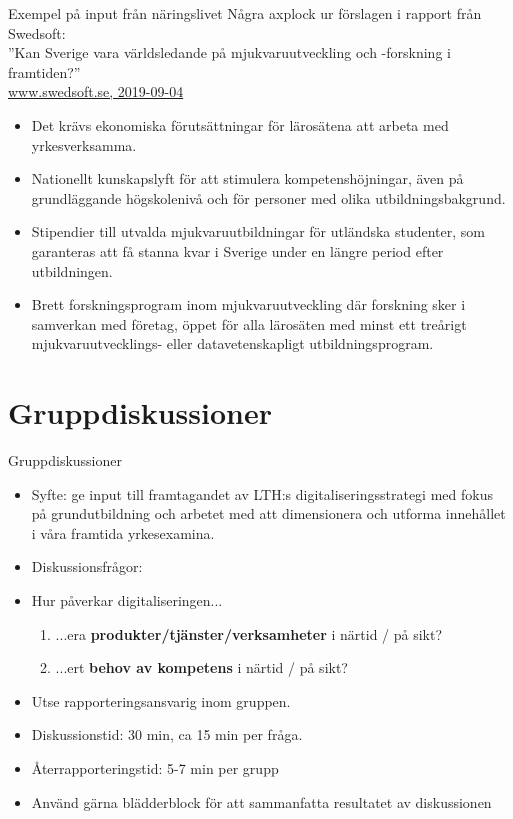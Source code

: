 \documentclass[aspectratio=169]{beamer}
\newenvironment{Slide}[1]%
  {\begin{frame}[environment=Slide]{#1}}
  {\end{frame}}%
\begin{document}
\begin{Slide}{Exempel på input från näringslivet}
  Några axplock ur förslagen i rapport från Swedsoft: \\''Kan Sverige vara världsledande på mjukvaruutveckling och -forskning i framtiden?''\\
  \href{https://www.swedsoft.se/wp-content/uploads/sites/7/2019/09/Swedsoft-Helhetssyn-p\%C3\%A5-mjukvarans-betydelse-f\%C3\%B6r-digitalisering-och-konkurrenskraft.pdf}{www.swedsoft.se, 2019-09-04}
\begin{itemize}
  \item Det krävs ekonomiska förutsättningar för lärosätena att arbeta med yrkesverksamma.
  \item Nationellt kunskapslyft för att stimulera kompetenshöjningar, även på grundläggande högskolenivå och för personer med olika utbildningsbakgrund.
  \item Stipendier till utvalda mjukvaruutbildningar för utländska studenter, som garanteras att få stanna kvar i Sverige under en längre period efter utbildningen.
  \item Brett forskningsprogram inom mjukvaruutveckling där forskning sker i samverkan med företag, öppet för alla lärosäten med minst ett treårigt mjukvaruutvecklings- eller datavetenskapligt utbildningsprogram.
\end{itemize}
\end{Slide}




\section{Gruppdiskussioner}

\begin{Slide}{Gruppdiskussioner}
  \begin{itemize}
    \item Syfte: ge input till framtagandet av LTH:s digitaliseringsstrategi med fokus på grundutbildning och arbetet med att dimensionera och utforma innehållet i våra framtida yrkesexamina.
    \item Diskussionsfrågor: \\ 
    \item[] Hur påverkar digitaliseringen...

    \begin{enumerate}
        \item  ...era \textbf{produkter/tjänster/verksamheter} i
        närtid / på sikt?
        
        \item ...ert \textbf{behov av kompetens} i närtid / på
        sikt?
    \end{enumerate}

    \item Utse rapporteringsansvarig inom gruppen.
    \item Diskussionstid: 30 min, ca 15 min per fråga.
    \item Återrapporteringstid: 5-7 min per grupp
    \item Använd gärna blädderblock för att sammanfatta resultatet av diskussionen 
  \end{itemize}
\end{Slide}
\end{document}
